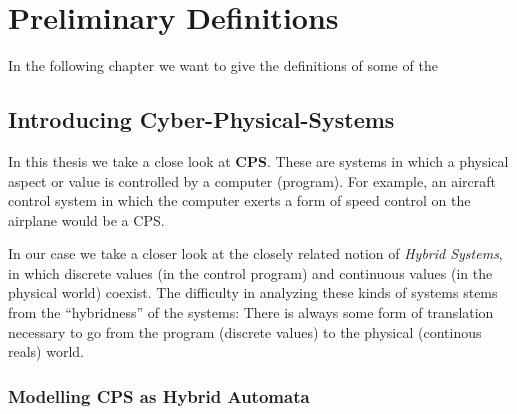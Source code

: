 

\chapter{Preliminary Definitions}
\label{ch:Preliminary}

In the following chapter we want to give the definitions of some of the 
\section{Introducing Cyber-Physical-Systems}
\label{sec:pre:cps}

In this thesis we take a close look at \textbf{CPS}. These are systems in which a physical aspect or value is controlled by a computer (program). For example, an aircraft control system in which the computer exerts a form of speed control on the airplane would be a CPS. 

In our case we take a closer look at the closely related notion of \textit{Hybrid Systems}, in which discrete values (in the control program) and continuous values (in the physical world) coexist. The difficulty in analyzing these kinds of systems stems from the ``hybridness'' of the systems: There is always some form of translation necessary to go from the program (discrete values) to the physical (continous reals) world. 

\subsection{Modelling CPS as Hybrid Automata}

